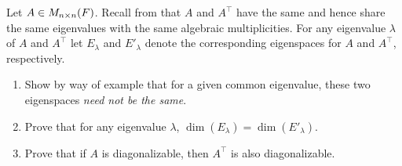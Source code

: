 \begin{exercise} \label{exercise 5.2.14}
Let \(A \in M_{n \times n}(F)\).
Recall from  that \(A\) and \(A^\top\) have the same \CPOLY{} and hence share the same eigenvalues with the same algebraic multiplicities.
For any eigenvalue \(\lambda\) of \(A\) and \(A^\top\) let \(E_{\lambda}\) and \(E'_{\lambda}\) denote the corresponding eigenspaces for \(A\) and \(A^{\top}\), respectively.
\begin{enumerate}
\item Show by way of example that for a given common eigenvalue, these two eigenspaces \emph{need not be the same}.

\item Prove that for any eigenvalue \(\lambda\), \(\dim(E_{\lambda}) = \dim(E'_{\lambda})\).

\item Prove that if \(A\) is diagonalizable, then \(A^\top\) is also diagonalizable.
\end{enumerate}
\end{exercise}

